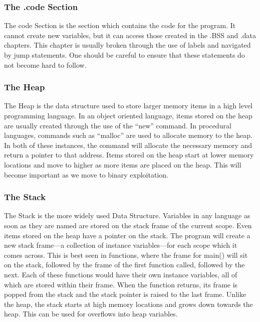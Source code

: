 					\subsubsection{The .code Section}
						The code Section is the section which contains the code for the program. 
						It cannot create new variables, but it can access those created in the .BSS and .data chapters. 
						This chapter is usually broken through the use of labels and navigated by jump statements. 
						One should be careful to ensure that these statements do not become hard to follow. 
					\subsubsection{The Heap}
						The Heap is the data structure used to store larger memory items in a high level programming language. 
						In an object oriented language, items stored on the heap are usually created through the use of the ``new'' command. 
						In procedural languages, commands such as ``malloc'' are used to allocate memory to the heap. 
						In both of these instances, the command will allocate the necessary memory and return a pointer to that address. 
						Items stored on the heap start at lower memory locations and move to higher as more items are placed on the heap. 
						This will become important as we move to binary exploitation. 
					\subsubsection{The Stack}
						The Stack is the more widely used Data Structure. 
						Variables in any language as soon as they are named are stored on the stack frame of the current scope. 
						Even items stored on the heap have a pointer on the stack. 
						The program will create a new stack frame---a collection of instance variables---for each scope which it comes across. 
						This is best seen in functions, where the frame for main() will sit on the stack, followed by the frame of the first function called, followed by the next. 
						Each of these functions would have their own instance variables, all of which are stored within their frame. 
						When the function returns, its frame is popped from the stack and the stack pointer is raised to the last frame. 
						Unlike the heap, the stack starts at high memory locations and grows down towards the heap. 
						This can be used for overflows into heap variables. 
